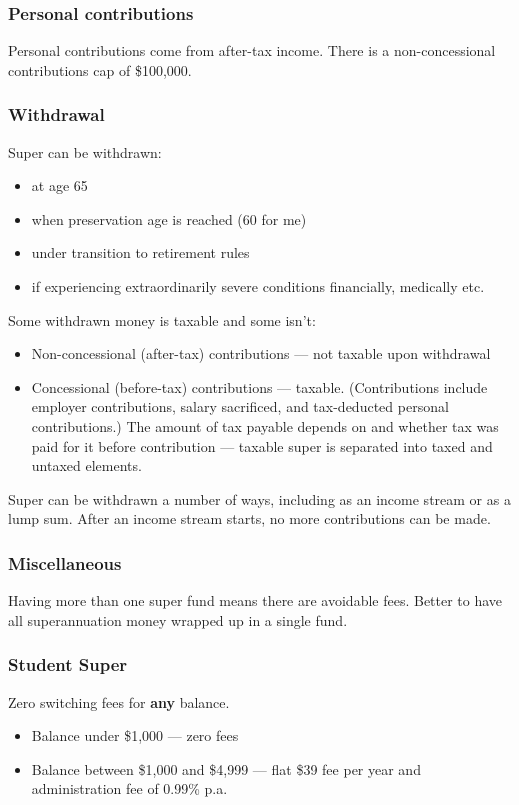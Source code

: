 \documentclass[oneside]{book}
\begin{document}
\subsubsection{Personal contributions}
Personal contributions come from after-tax income. There is a non-concessional contributions cap of \$100,000.

\subsubsection{Withdrawal}
Super can be withdrawn:
\begin{itemize}
	\item at age 65
	\item when preservation age is reached (60 for me)
	\item under transition to retirement rules
	\item if experiencing extraordinarily severe conditions financially, medically etc.
\end{itemize}
Some withdrawn money is taxable and some isn't:
\begin{itemize}
	\item Non-concessional (after-tax) contributions --- not taxable upon withdrawal
	\item Concessional (before-tax) contributions --- taxable. (Contributions include employer contributions, salary sacrificed, and tax-deducted personal contributions.) The amount of tax payable depends on and whether tax was paid for it before contribution --- taxable super is separated into taxed and untaxed elements.
\end{itemize}
Super can be withdrawn a number of ways, including as an income stream or as a lump sum. After an income stream starts, no more contributions can be made.

\subsubsection{Miscellaneous}
Having more than one super fund means there are avoidable fees. Better to have all superannuation money wrapped up in a single fund.

\subsubsection{Student Super}
Zero switching fees for \textbf{any} balance.
\begin{itemize}
	\item Balance under \$1,000 --- zero fees
	\item Balance between \$1,000 and \$4,999 --- flat \$39 fee per year and administration fee of 0.99\% p.a.
\end{itemize}
\end{document}
